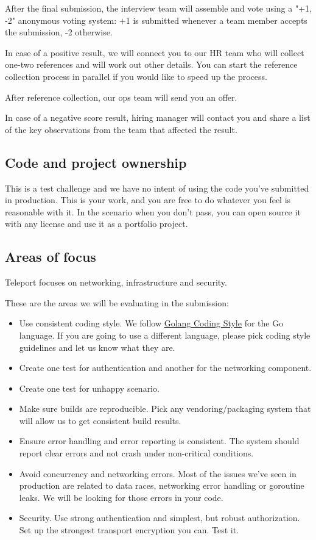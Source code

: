 \documentclass{article}
\begin{document}
After the final submission, the interview team will assemble and vote using a "+1, -2" anonymous voting system: +1 is submitted whenever a team member accepts the submission, -2 otherwise.

In case of a positive result, we will connect you to our HR team who will collect one-two references and will work out other details. You can start the reference collection process in parallel if you would like to speed up the process.

After reference collection, our ops team will send you an offer.

In case of a negative score result, hiring manager will contact you and share a list of the key observations from the team that affected the result.

\subsection{Code and project ownership}

This is a test challenge and we have no intent of using the code you've submitted in production.
This is your work, and you are free to do whatever you feel is reasonable with it.
In the scenario when you don't pass, you can open source it with any license and use it as a portfolio project.

\subsection{Areas of focus}

Teleport focuses on networking, infrastructure and security.

These are the areas we will be evaluating in the submission:

  \begin{itemize}
  \item Use consistent coding style. We follow \href{https://github.com/golang/go/wiki/CodeReviewComments}{Golang Coding Style} for the Go language. If you are going to use a different language, please pick coding style guidelines and let us know what they are.
  \item Create one test for authentication and another for the networking component.
  \item Create one test for unhappy scenario.
  \item Make sure builds are reproducible. Pick any vendoring/packaging system that will allow us to get consistent build results.
  \item Ensure error handling and error reporting is consistent. The system should report clear errors and not crash under non-critical conditions.
  \item Avoid concurrency and networking errors. Most of the issues we've seen in production are related to data races, networking error handling or goroutine leaks. We will be looking for those errors in your code.
  \item Security. Use strong authentication and simplest, but robust authorization. Set up the strongest transport encryption you can. Test it.
  \end{itemize}
\end{document}
